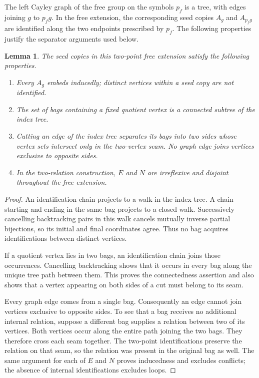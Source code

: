 \documentclass[11pt,reqno]{amsart}
\newtheorem{lemma}[theorem]{Lemma}
\theoremstyle{definition}
\theoremstyle{remark}
\begin{document}
The left Cayley graph of the free group on the symbols $p_f$ is a tree, with edges joining $g$ to $p_fg$. In the free extension, the corresponding seed copies $A_g$ and $A_{p_fg}$ are identified along the two endpoints prescribed by $p_f$. The following properties justify the separator arguments used below.

\begin{lemma}\label{lem:tree-structure}
The seed copies in this two-point free extension satisfy the following properties.
\begin{enumerate}
\item Every $A_g$ embeds inducedly; distinct vertices within a seed copy are not identified.
\item The set of bags containing a fixed quotient vertex is a connected subtree of the index tree.
\item Cutting an edge of the index tree separates its bags into two sides whose vertex sets intersect only in the two-vertex seam. No graph edge joins vertices exclusive to opposite sides.
\item In the two-relation construction, $E$ and $N$ are irreflexive and disjoint throughout the free extension.
\end{enumerate}
\end{lemma}
\begin{proof}
An identification chain projects to a walk in the index tree. A chain starting and ending in the same bag projects to a closed walk. Successively cancelling backtracking pairs in this walk cancels mutually inverse partial bijections, so its initial and final coordinates agree. Thus no bag acquires identifications between distinct vertices.

If a quotient vertex lies in two bags, an identification chain joins those occurrences. Cancelling backtracking shows that it occurs in every bag along the unique tree path between them. This proves the connectedness assertion and also shows that a vertex appearing on both sides of a cut must belong to its seam.

Every graph edge comes from a single bag. Consequently an edge cannot join vertices exclusive to opposite sides. To see that a bag receives no additional internal relation, suppose a different bag supplies a relation between two of its vertices. Both vertices occur along the entire path joining the two bags. They therefore cross each seam together. The two-point identifications preserve the relation on that seam, so the relation was present in the original bag as well. The same argument for each of $E$ and $N$ proves inducedness and excludes conflicts; the absence of internal identifications excludes loops.
\end{proof}
\end{document}
